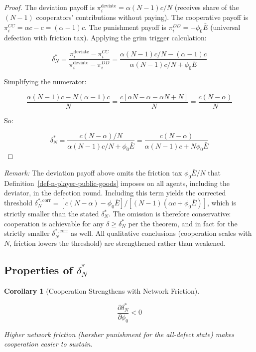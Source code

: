 \documentclass[11pt]{article}
\theoremstyle{plain}
\newtheorem{corollary}[theorem]{Corollary}
\theoremstyle{definition}
\theoremstyle{remark}
\let\origsubsection\subsection
\renewcommand{\subsection}{\needspace{7\baselineskip}\origsubsection}
\begin{document}
\begin{proof}
The deviation payoff is $\pi_i^{\text{deviate}} = \alpha(N-1)c/N$ (receives share of the $(N-1)$ cooperators' contributions without paying). The cooperative payoff is $\pi_i^{CC} = \alpha c - c = (\alpha-1)c$. The punishment payoff is $\pi_i^{DD} = -\phi_0\bar{E}$ (universal defection with friction tax). Applying the grim trigger calculation:

$$\delta_N^* = \frac{\pi_i^{\text{deviate}} - \pi_i^{CC}}{\pi_i^{\text{deviate}} - \pi_i^{DD}} = \frac{\alpha(N-1)c/N - (\alpha-1)c}{\alpha(N-1)c/N + \phi_0\bar{E}}$$

Simplifying the numerator:

$$\frac{\alpha(N-1)c - N(\alpha-1)c}{N} = \frac{c[\alpha N - \alpha - \alpha N + N]}{N} = \frac{c(N - \alpha)}{N}$$

So:

$$\delta_N^* = \frac{c(N - \alpha)/N}{\alpha(N-1)c/N + \phi_0\bar{E}} = \frac{c(N-\alpha)}{\alpha(N-1)c + N\phi_0\bar{E}}$$
\end{proof}

\emph{Remark:} The deviation payoff above omits the friction tax
\(\phi_0\bar{E}/N\) that Definition~\ref{def-n-player-public-goods}
imposes on all agents, including the deviator, in the defection round.
Including this term yields the corrected threshold
\(\delta_N^{*,\text{corr}} = [c(N-\alpha) - \phi_0\bar{E}] / [(N-1)(\alpha c + \phi_0\bar{E})]\),
which is strictly smaller than the stated \(\delta_N^*\). The omission
is therefore conservative: cooperation is achievable for any
\(\delta \geq \delta_N^*\) per the theorem, and in fact for the strictly
smaller \(\delta_N^{*,\text{corr}}\) as well. All qualitative
conclusions (cooperation scales with \(N\), friction lowers the
threshold) are strengthened rather than weakened.

\subsection{\texorpdfstring{Properties of
\(\delta_N^*\)}{Properties of \textbackslash delta\_N\^{}*}}\label{properties-of-delta-n-star}

\begin{corollary}[Cooperation Strengthens with Network Friction]
\label{cor-cooperation-strengthens-friction}

$$\frac{\partial \delta_N^*}{\partial \phi_0} < 0$$

Higher network friction (harsher punishment for the all-defect state) makes cooperation easier to sustain.
\end{corollary}
\end{document}
